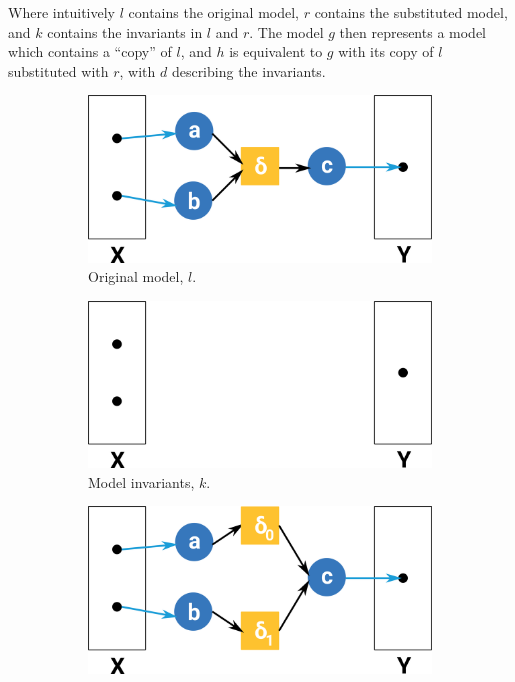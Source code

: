 \documentclass[12pt]{galois-whitepaper}
\begin{document}
    \centerline{
  }

Where intuitively $l$ contains the original model, $r$ contains the
substituted model, and $k$ contains the invariants in $l$ and $r$.
The model $g$ then represents a model which contains a ``copy'' of
$l$, and $h$ is equivalent to $g$ with its copy of $l$ substituted
with $r$, with $d$ describing the invariants.
  
  \begin{figure}
    \centering
    \begin{subfigure}[b]{0.3\textwidth}
      \includegraphics[width=\textwidth]{petri-net.png}
      \caption{Original model, $l$.}
      \label{Fig:Sub-L}
    \end{subfigure}
    \begin{subfigure}[b]{0.3\textwidth}
      \includegraphics[width=\textwidth]{signature.png}
      \caption{Model invariants, $k$.}
      \label{Fig:Sub-K}
    \end{subfigure}
    \begin{subfigure}[b]{0.3\textwidth}
      \includegraphics[width=\textwidth]{petri-net2.png}

\end{subfigure}
\end{figure}
\end{document}

